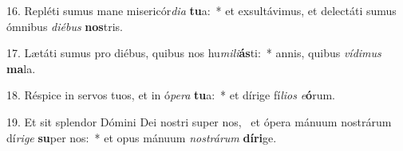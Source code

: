 16. Repléti sumus mane misericór\textit{di}\textit{a} \textbf{tu}a:~*  et exsultávimus, et delectáti sumus ómnibus \textit{di}\textit{é}\textit{bus} \textbf{nos}tris.\

17. Lætáti sumus pro diébus, quibus nos hu\textit{mi}\textit{li}\textbf{ás}ti:~*  annis, quibus \textit{ví}\textit{di}\textit{mus} \textbf{ma}la.\

18. Réspice in servos tuos, et in ó\textit{pe}\textit{ra} \textbf{tu}a:~*  et dírige fí\textit{li}\textit{os} \textit{e}\textbf{ó}rum.\

19. Et sit splendor Dómini Dei nostri super nos, \dag\  et ópera mánuum nostrárum dí\textit{ri}\textit{ge} \textbf{su}per nos:~*  et opus mánuum \textit{nos}\textit{trá}\textit{rum} \textbf{dí}\textbf{ri}ge.\

